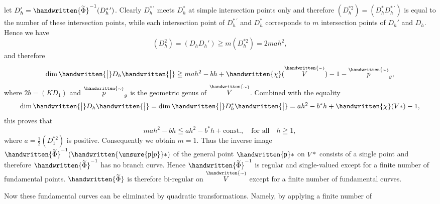 let $D_h'=\handwritten{\widetilde{\Phi}}^{-1}(D_h^{*\,\prime})$. Clearly $D_h^{*\,\prime}$ meets $D_h^{*}$ at simple intersection points only and therefore $(D_h^{*2})=(D_h^{*}D_h^{*\,\prime})$ is equal to the number of these intersection points, while each intersection point of $D_h^{*\,\prime}$ and $D_h^{*}$ corresponds to $m$ intersection points of $D_h'$ and $D_h$. Hence we have
\[
(D_h^2)=(D_hD_h')\geqq m(D_h^{*2})=2mah^2,
\]
and therefore
\[
\dim\handwritten{\big|}D_h\handwritten{\big|}\geqq mah^2-bh+\handwritten{\chi}(\overset{\handwritten{\scriptscriptstyle\sim}}{V})-1-\overset{\handwritten{\scriptscriptstyle\sim}}{p}_g,
\]
where $2b=(KD_1)$ and $\overset{\handwritten{\scriptscriptstyle\sim}}{p}_g$ is the geometric genus of $\overset{\handwritten{\scriptscriptstyle\sim}}{V}$. Combined with the equality
\[
\dim\handwritten{\big|}D_h\handwritten{\big|}=\dim\handwritten{\big|}D_h^{*}\handwritten{\big|}=ah^2-b^{*}h+\handwritten{\chi}(V*)-1,
\]
this proves that
\[
mah^2-bh\leqq ah^2-b^{*}h+\mathrm{const.},\quad\text{for all}\quad h\geqq1,
\]
where $a=\frac12(D_1^{*2})$ is positive. Consequently we obtain $m=1$. Thus the inverse image $\handwritten{\widetilde{\Phi}}^{-1}(\handwritten{\unsure{\mathfrak p|p}}*)$ of the general point $\handwritten{\mathfrak p}*$ on $V*$ consists of a single point and therefore $\handwritten{\widetilde{\Phi}}^{-1}$ has no branch curve. Hence $\handwritten{\widetilde{\Phi}}^{-1}$ is regular and single-valued except for a finite number of fundamental points. $\handwritten{\widetilde{\Phi}}$ is therefore bi-regular on $\overset{\handwritten{\scriptscriptstyle\sim}}{V}$ except for a finite number of fundamental curves.

Now these fundamental curves can be eliminated by quadratic transformations. Namely, by applying a finite number of

